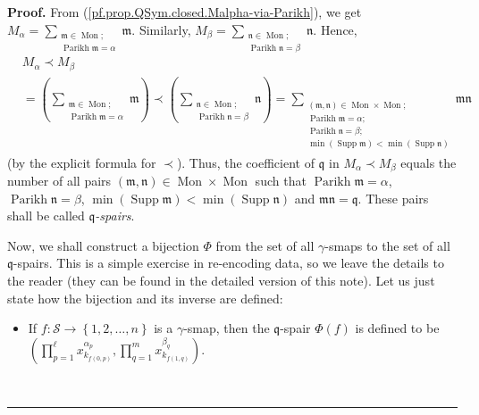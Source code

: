 \documentclass[numbers=enddot,12pt,final,onecolumn,notitlepage,abstracton]{scrartcl}%
\theoremstyle{definition}
\newenvironment{proof}[1][Proof]{\noindent\textbf{#1.} }{\ \rule{0.5em}{0.5em}}
\newenvironment{vershort}{}{}
\let\sumnonlimits\sum
\let\prodnonlimits\prod
\renewcommand{\sum}{\sumnonlimits\limits}
\renewcommand{\prod}{\prodnonlimits\limits}
\begin{document}
\begin{proof}
\begin{vershort}
From (\ref{pf.prop.QSym.closed.Malpha-via-Parikh}), we get $M_{\alpha}%
=\sum_{\substack{\mathfrak{m}\in\operatorname*{Mon};\\\operatorname*{Parikh}%
\mathfrak{m}=\alpha}}\mathfrak{m}$. Similarly, $M_{\beta}=\sum
_{\substack{\mathfrak{n}\in\operatorname*{Mon};\\\operatorname*{Parikh}%
\mathfrak{n}=\beta}}\mathfrak{n}$. Hence,%
\begin{align*}
&  M_{\alpha}\left.  \prec\right.  M_{\beta}\\
&  =\left(  \sum_{\substack{\mathfrak{m}\in\operatorname*{Mon}%
;\\\operatorname*{Parikh}\mathfrak{m}=\alpha}}\mathfrak{m}\right)  \left.
\prec\right.  \left(  \sum_{\substack{\mathfrak{n}\in\operatorname*{Mon}%
;\\\operatorname*{Parikh}\mathfrak{n}=\beta}}\mathfrak{n}\right)
=\sum_{\substack{\left(  \mathfrak{m},\mathfrak{n}\right)  \in
\operatorname*{Mon}\times\operatorname*{Mon};\\\operatorname*{Parikh}%
\mathfrak{m}=\alpha;\\\operatorname*{Parikh}\mathfrak{n}=\beta;\\\min\left(
\operatorname*{Supp}\mathfrak{m}\right)  <\min\left(  \operatorname*{Supp}%
\mathfrak{n}\right)  }}\mathfrak{mn}%
\end{align*}
(by the explicit formula for $\left.  \prec\right.  $). Thus, the coefficient
of $\mathfrak{q}$ in $M_{\alpha}\left.  \prec\right.  M_{\beta}$ equals the
number of all pairs $\left(  \mathfrak{m},\mathfrak{n}\right)  \in
\operatorname*{Mon}\times\operatorname*{Mon}$ such that
$\operatorname*{Parikh}\mathfrak{m}=\alpha$, $\operatorname*{Parikh}%
\mathfrak{n}=\beta$, $\min\left(  \operatorname*{Supp}\mathfrak{m}\right)
<\min\left(  \operatorname*{Supp}\mathfrak{n}\right)  $ and $\mathfrak{mn}%
=\mathfrak{q}$. These pairs shall be called $\mathfrak{q}$\textit{-spairs}.

Now, we shall construct a bijection $\Phi$ from the set of all $\gamma$-smaps
to the set of all $\mathfrak{q}$-spairs. This is a simple exercise in
re-encoding data, so we leave the details to the reader (they can be found in
the detailed version of this note). Let us just state how the bijection and
its inverse are defined:

\begin{itemize}
\item If $f:\mathcal{S}\rightarrow\left\{  1,2,\ldots,n\right\}  $ is a
$\gamma$-smap, then the $\mathfrak{q}$-spair $\Phi\left(  f\right)  $ is
defined to be $\left(  \prod_{p=1}^{\ell}x_{k_{f\left(  0,p\right)  }}%
^{\alpha_{p}},\prod_{q=1}^{m}x_{k_{f\left(  1,q\right)  }}^{\beta_{q}}\right)
$.


\end{itemize}
\end{vershort}
\end{proof}
\end{document}
